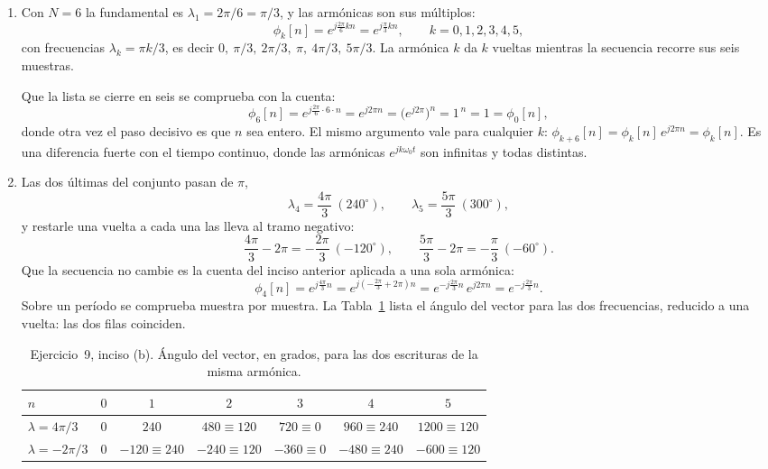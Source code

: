 \documentclass[10pt,a4paper]{article}
\begin{document}
	\begin{enumerate}
		\item Con $N=6$ la fundamental es
		$\lambda_1 = 2\pi/6 = \pi/3$, y las armónicas son sus múltiplos:
		\[
			\phi_k[n] = e^{j\frac{2\pi}{6}kn} = e^{j\frac{\pi}{3}kn},
			\qquad k = 0,1,2,3,4,5,
		\]
		con frecuencias $\lambda_k = \pi k/3$, es decir
		$0,\ \pi/3,\ 2\pi/3,\ \pi,\ 4\pi/3,\ 5\pi/3$. La armónica $k$ da $k$ vueltas mientras
		la secuencia recorre sus seis muestras.

		Que la lista se cierre en seis se comprueba con la cuenta:
		\[
			\phi_6[n] = e^{j\frac{2\pi}{6}\cdot 6 \cdot n} = e^{j2\pi n}
			          = \big(e^{j2\pi}\big)^{n} = 1^{\,n} = 1 = \phi_0[n],
		\]
		donde otra vez el paso decisivo es que $n$ sea entero. El mismo argumento vale para
		cualquier $k$: $\phi_{k+6}[n]=\phi_k[n]\,e^{j2\pi n}=\phi_k[n]$. Es una diferencia
		fuerte con el tiempo continuo, donde las armónicas $e^{jk\omega_0 t}$ son infinitas y
		todas distintas.

		\item Las dos últimas del
		conjunto pasan de $\pi$,
		\[
			\lambda_4 = \frac{4\pi}{3}\ (240^\circ),
			\qquad
			\lambda_5 = \frac{5\pi}{3}\ (300^\circ),
		\]
		y restarle una vuelta a cada una las lleva al tramo negativo:
		\[
			\frac{4\pi}{3} - 2\pi = -\frac{2\pi}{3}\ (-120^\circ),
			\qquad
			\frac{5\pi}{3} - 2\pi = -\frac{\pi}{3}\ (-60^\circ).
		\]
		Que la secuencia no cambie es la cuenta del inciso anterior aplicada a una sola
		armónica:
		\[
			\phi_4[n] = e^{j\frac{4\pi}{3}n}
			          = e^{j\left(-\frac{2\pi}{3}+2\pi\right)n}
			          = e^{-j\frac{2\pi}{3}n}\,e^{j2\pi n}
			          = e^{-j\frac{2\pi}{3}n}.
		\]
		Sobre un período se comprueba muestra por muestra. La Tabla~\ref{tab:sol_ej9} lista el
		ángulo del vector para las dos frecuencias, reducido a una vuelta: las dos filas
		coinciden.

		\begin{table}[H]
			\centering
			\caption{Ejercicio~9, inciso (b). Ángulo del vector, en grados, para las dos
			escrituras de la misma armónica.}
			\label{tab:sol_ej9}
			\begin{tabular}{lcccccc}
				\toprule
				$n$ & $0$ & $1$ & $2$ & $3$ & $4$ & $5$ \\
				\midrule
				$\lambda = 4\pi/3$   & $0$ & $240$ & $480 \equiv 120$ & $720 \equiv 0$
				                     & $960 \equiv 240$ & $1200 \equiv 120$ \\
				$\lambda = -2\pi/3$  & $0$ & $-120 \equiv 240$ & $-240 \equiv 120$
				                     & $-360 \equiv 0$ & $-480 \equiv 240$ & $-600 \equiv 120$ \\
				\bottomrule
			\end{tabular}
		\end{table}


\end{enumerate}
\end{document}
